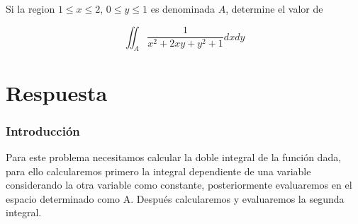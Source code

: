 \item Si la region $1 \leq x \leq 2 $, $0 \leq y \leq 1 $ es denominada $A$, determine el valor de
        \begin{LARGE}
            \begin{equation*}
                \iint_A \frac{1}{x^2 + 2xy + y^2 + 1} dx dy
            \end{equation*}
        \end{LARGE}
\section*{Respuesta}
    \subsubsection*{Introducción}
        Para este problema necesitamos calcular la doble integral de la función dada, para ello calcularemos primero la integral dependiente
        de una variable considerando la otra variable como constante, posteriormente evaluaremos en el espacio determinado como A. Después 
        calcularemos y evaluaremos la segunda integral.
